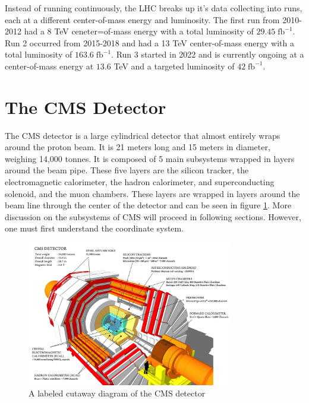 Instead of running continuously, the LHC breaks up it's data collecting into runs, each at a different center-of-mass energy and luminosity. The first run from 2010-2012 had a 8 TeV ceneter=of-mass energy with a total luminosity of $29.45 \; \text{fb}^{-1}$. Run 2 occurred from 2015-2018 and had a 13 TeV center-of-mass energy with a total luminosity of $163.6 \; \text{fb}^{-1}$. Run 3 started in 2022 and is currently ongoing at a center-of-mass energy at $13.6$ TeV and a targeted luminosity of $42 \; \text{fb}^{-1}$. 

\section{The CMS Detector}

The CMS detector is a large cylindrical detector that almost entirely wraps around the proton beam. It is 21 meters long and 15 meters in diameter, weighing 14,000 tonnes. It is composed of 5 main subsystems wrapped in layers around the beam pipe. These five layers are the silicon tracker, the electromagnetic calorimeter, the hadron calorimeter, and superconducting solenoid, and the muon chambers. These layers are wrapped in layers around the beam line through the center of the detector and can be seen in figure \ref{fig:cms-detector-cutout.png}. More discussion on the subsystems of CMS will proceed in following sections. However, one must first understand the coordinate system.

\begin{figure}[htbp]
    \centering
    \includegraphics[width=0.8\textwidth]{figures/chapter3/cms-detector-cutout.png}
    \caption{A labeled cutaway diagram of the CMS detector \cite{ref:sakuma}}
    \label{fig:cms-detector-cutout.png}
\end{figure}


